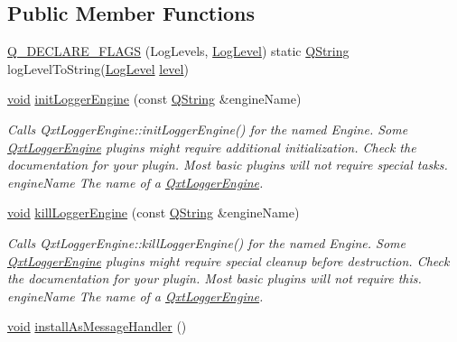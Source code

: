 \subsection*{Public Member Functions}
\begin{DoxyCompactItemize}
\item 
\hyperlink{class_qxt_logger_a431a4066c8bf11360de6a04db81bfd82}{Q\-\_\-\-D\-E\-C\-L\-A\-R\-E\-\_\-\-F\-L\-A\-G\-S} (Log\-Levels, \hyperlink{class_qxt_logger_ac2071072628aa786466124cc32a324e7}{Log\-Level}) static \hyperlink{group___u_a_v_objects_plugin_gab9d252f49c333c94a72f97ce3105a32d}{Q\-String} log\-Level\-To\-String(\hyperlink{class_qxt_logger_ac2071072628aa786466124cc32a324e7}{Log\-Level} \hyperlink{glext_8h_abc60a79088789bd61297bf5f9ff500d1}{level})
\item 
\hyperlink{group___u_a_v_objects_plugin_ga444cf2ff3f0ecbe028adce838d373f5c}{void} \hyperlink{class_qxt_logger_a20cd6ec9a3515187a3f297e4e5f4d579}{init\-Logger\-Engine} (const \hyperlink{group___u_a_v_objects_plugin_gab9d252f49c333c94a72f97ce3105a32d}{Q\-String} \&engine\-Name)
\begin{DoxyCompactList}\small\item\em Calls Qxt\-Logger\-Engine\-::init\-Logger\-Engine() for the named Engine. Some \hyperlink{class_qxt_logger_engine}{Qxt\-Logger\-Engine} plugins might require additional initialization. Check the documentation for your plugin. Most basic plugins will not require special tasks. {\itshape engine\-Name} The name of a \hyperlink{class_qxt_logger_engine}{Qxt\-Logger\-Engine}. \end{DoxyCompactList}\item 
\hyperlink{group___u_a_v_objects_plugin_ga444cf2ff3f0ecbe028adce838d373f5c}{void} \hyperlink{class_qxt_logger_af04df8651b85f90634e94ae63ca5600a}{kill\-Logger\-Engine} (const \hyperlink{group___u_a_v_objects_plugin_gab9d252f49c333c94a72f97ce3105a32d}{Q\-String} \&engine\-Name)
\begin{DoxyCompactList}\small\item\em Calls Qxt\-Logger\-Engine\-::kill\-Logger\-Engine() for the named Engine. Some \hyperlink{class_qxt_logger_engine}{Qxt\-Logger\-Engine} plugins might require special cleanup before destruction. Check the documentation for your plugin. Most basic plugins will not require this. {\itshape engine\-Name} The name of a \hyperlink{class_qxt_logger_engine}{Qxt\-Logger\-Engine}. \end{DoxyCompactList}\item 
\hyperlink{group___u_a_v_objects_plugin_ga444cf2ff3f0ecbe028adce838d373f5c}{void} \hyperlink{class_qxt_logger_a93f57140562dadebfb7cd53eab41a64a}{install\-As\-Message\-Handler} ()

\end{DoxyCompactItemize}
